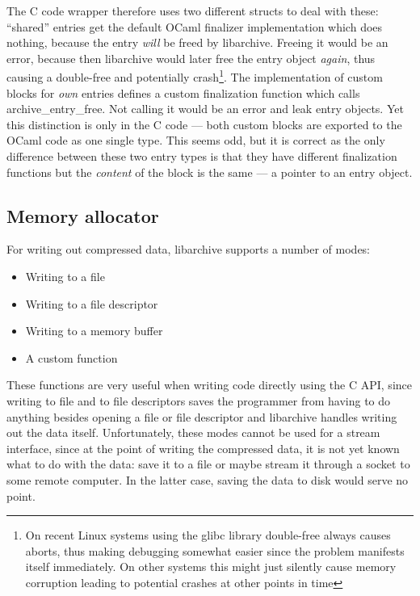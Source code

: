 \documentclass[parskip=half]{scrreprt}
\newcommand\inline[1]{{\addfontfeature{Letters=SmallCaps}#1}}
\begin{document}
The C code wrapper therefore uses two different structs to deal with these:
\enquote{shared} entries get the default OCaml finalizer implementation which
does nothing, because the entry \emph{will} be freed by libarchive. Freeing it
would be an error, because then libarchive would later free the entry object
\emph{again}, thus causing a double-free and potentially crash\footnote{On
recent Linux systems using the glibc library double-free always causes aborts,
thus making debugging somewhat easier since the problem manifests itself
immediately.  On other systems this might just silently cause memory corruption
leading to potential crashes at other points in time}. The implementation of
custom blocks for \emph{own} entries defines a custom finalization function
which calls \inline{archive\_entry\_free}. Not calling it would be an error and
leak entry objects. Yet this distinction is only in the C code — both custom
blocks are exported to the OCaml code as one single type.  This seems odd, but
it is correct as the only difference between these two entry types is that they
have different finalization functions but the \emph{content} of the block is
the same — a pointer to an entry object.

\subsection{Memory allocator}
\label{sec:allocator}

For writing out compressed data, libarchive supports a number of modes:

\begin{itemize}
  \item Writing to a file
  \item Writing to a file descriptor
  \item Writing to a memory buffer
  \item A custom function
\end{itemize}

These functions are very useful when writing code directly using the C API,
since writing to file and to file descriptors saves the programmer from having
to do anything besides opening a file or file descriptor and libarchive handles
writing out the data itself. Unfortunately, these modes cannot be used for a
stream interface, since at the point of writing the compressed data, it is not
yet known what to do with the data: save it to a file or maybe stream it
through a socket to some remote computer. In the latter case, saving the data
to disk would serve no point.
\end{document}

